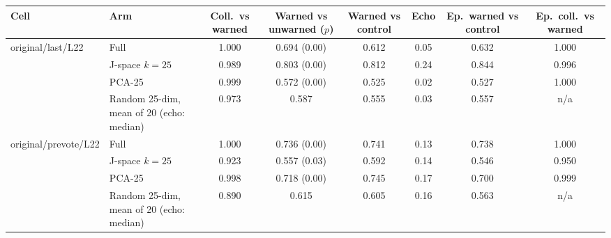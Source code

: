 \begin{tabular}{llcccccc}\toprule
Cell & Arm & Coll.\ vs warned & Warned vs unwarned ($p$) & Warned vs control & Echo & Ep.\ warned vs control & Ep.\ coll.\ vs warned\\\midrule
original/last/L22 & Full & 1.000 & 0.694 (0.00) & 0.612 & 0.05 & 0.632 & 1.000\\
 & J-space $k{=}25$ & 0.989 & 0.803 (0.00) & 0.812 & 0.24 & 0.844 & 0.996\\
 & PCA-25 & 0.999 & 0.572 (0.00) & 0.525 & 0.02 & 0.527 & 1.000\\
 & Random 25-dim, mean of 20 (echo: median) & 0.973 & 0.587 & 0.555 & 0.03 & 0.557 & n/a\\
\midrule
original/prevote/L22 & Full & 1.000 & 0.736 (0.00) & 0.741 & 0.13 & 0.738 & 1.000\\
 & J-space $k{=}25$ & 0.923 & 0.557 (0.03) & 0.592 & 0.14 & 0.546 & 0.950\\
 & PCA-25 & 0.998 & 0.718 (0.00) & 0.745 & 0.17 & 0.700 & 0.999\\
 & Random 25-dim, mean of 20 (echo: median) & 0.890 & 0.615 & 0.605 & 0.16 & 0.563 & n/a\\
\bottomrule\end{tabular}
